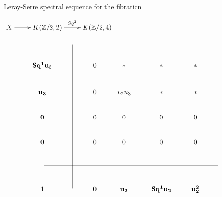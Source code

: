 \documentclass[11pt,a4paper,landscape]{slides}
\theoremstyle{plain}
\theoremstyle{definition}
\newcommand{\Z}{\mathbb{Z}}
\begin{document}
\sloppy

\centerline{Leray-Serre spectral sequence for the fibration}
\centerline{$\xymatrix{
X\ar[r] &K(\Z/2,2)\ar[r]^-{Sq^2} &K(\Z/2,4)
}$}
$$\xymatrix{
&&\\
{\bf Sq^1u_3}  &&0 &{*} &{*} &{*}\\
{\bf u_3}  &&0 &u_2u_3&{*} &{*}\\
{\bf 0} &&0 &0 &0 &0\\
{\bf 0} &&0 &0 &0 &0\\ \ar@{-}[rrrrrr] &&&&&&\\
{\bf 1} &\ar@{-}[uuuuuu] &{\bf 0} &{\bf u_2} &{\bf Sq^1u_2} &{\bf u_2^2}
}$$
\newpage
\end{document}
